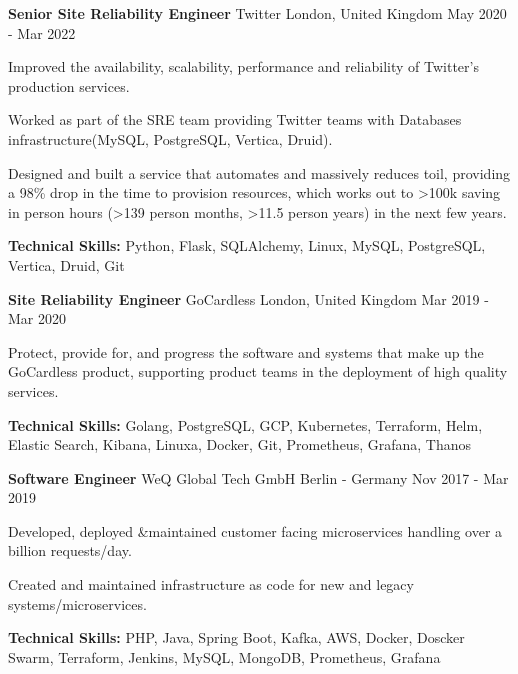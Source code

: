 \begin{cventries}
  \cventry
    {\textbf{Senior Site Reliability Engineer}} %
    {Twitter} %
    {London, United Kingdom} %
    {May 2020 - Mar 2022} %
    {
      \begin{cvitems} %
      \item {Improved the availability, scalability, performance and reliability of Twitter’s
        production services.}
      \item {Worked as part of the SRE team providing Twitter teams with Databases
        infrastructure(MySQL, PostgreSQL, Vertica, Druid).}
      \item {Designed and built a service that automates and massively reduces toil, providing a
        98\% drop in the time to provision resources, which works out to >100k saving in person
        hours (>139 person months, >11.5 person years) in the next few years.}
      \item {\textbf{Technical Skills:} Python, Flask, SQLAlchemy, Linux, MySQL, PostgreSQL,
        Vertica, Druid, Git}
      \end{cvitems}
    }

  \cventry
    {\textbf{Site Reliability Engineer}} %
    {GoCardless} %
    {London, United Kingdom} %
    {Mar 2019 - Mar 2020} %
    {
      \begin{cvitems} %
        \item {Protect, provide for, and progress the software and systems that make up the
          GoCardless product, supporting product teams in the deployment of high quality services.}
        \item {\textbf{Technical Skills:} Golang, PostgreSQL, GCP, Kubernetes, Terraform, Helm,
          Elastic Search, Kibana, Linuxa, Docker, Git, Prometheus, Grafana, Thanos}
      \end{cvitems}
    }

  \cventry
    {\textbf{Software Engineer}} %
    {WeQ Global Tech GmbH} %
    {Berlin - Germany} %
    {Nov 2017 - Mar 2019} %
    {
      \begin{cvitems} %
        \item {Developed, deployed \&maintained customer facing microservices handling over a
          billion requests/day.}
        \item {Created and maintained infrastructure as code for new and legacy
          systems/microservices.}
        \item {\textbf{Technical Skills:} PHP, Java, Spring Boot, Kafka, AWS, Docker, Doscker Swarm,
          Terraform, Jenkins, MySQL, MongoDB, Prometheus, Grafana}
      \end{cvitems}
    }


\end{cventries}
